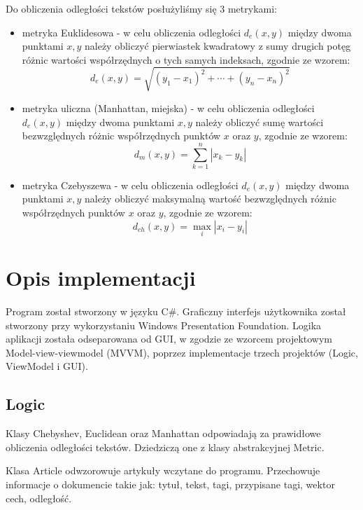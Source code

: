 \documentclass{classrep}
\begin{document}
Do obliczenia odległości tekstów posłużyliśmy się 3 metrykami: \newline

\begin{itemize}
\item metryka Euklidesowa - w celu obliczenia odległości $ d_{e}(x,y) $ między dwoma punktami $ x, y $ należy obliczyć pierwiastek kwadratowy z sumy drugich potęg różnic wartości współrzędnych o tych samych indeksach, zgodnie ze wzorem:
$$
d_{e}(x,y)= \sqrt{ (y_{1} - x_{1})^2 + \cdots + (y_{n} - x_{n})^2 }
$$

\item metryka uliczna (Manhattan, miejska) - w celu obliczenia odległości $ d_{e}(x,y) $ między dwoma punktami $ x, y $ należy obliczyć sumę wartości bezwzględnych różnic współrzędnych punktów $ x $ oraz $ y $, zgodnie ze wzorem:
$$
d_{m}(x,y)= \sum_{k=1}^{n} | x_{k} - y_{k} |
$$

\item metryka Czebyszewa - w celu obliczenia odległości $ d_{e}(x,y) $ między dwoma punktami $ x, y $ należy obliczyć maksymalną wartość bezwzględnych różnic współrzędnych punktów $ x $ oraz $ y $, zgodnie ze wzorem:
$$
d_{ch}(x,y)= \max_{i} |x_{i} - y_{i}|
$$
\newline
\end{itemize}

\section{Opis implementacji}
Program został stworzony w języku C\#. Graficzny interfejs użytkownika został stworzony przy  wykorzystaniu Windows Presentation Foundation. Logika aplikacji została odseparowana od GUI, w zgodzie ze wzorcem projektowym Model-view-viewmodel (MVVM), poprzez implementacje trzech projektów (Logic, ViewModel i GUI).


\subsection{Logic}
Klasy Chebyshev, Euclidean oraz Manhattan odpowiadają za prawidłowe obliczenia odległości tekstów. Dziedziczą one z klasy abstrakcyjnej Metric. \newline

Klasa Article odwzorowuje artykuły wczytane do programu. Przechowuje informacje o dokumencie takie jak: tytuł, tekst, tagi, przypisane tagi, wektor cech, odległość. \newline
\end{document}
